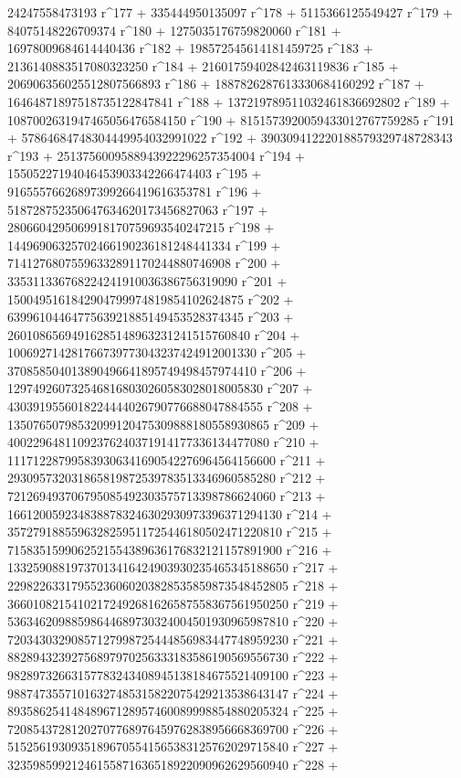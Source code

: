        24247558473193 r^177 + 335444950135097 r^178 + 
       5115366125549427 r^179 + 84075148226709374 r^180 + 
       1275035176759820060 r^181 + 16978009684614440436 r^182 + 
       198572545614181459725 r^183 + 2136140883517080323250 r^184 + 
       21601759402842463119836 r^185 + 
       206906356025512807566893 r^186 + 
       1887826287613330684160292 r^187 + 
       16464871897518735122847841 r^188 + 
       137219789511032461836692802 r^189 + 
       1087002631947465056476584150 r^190 + 
       8151573920059433012767759285 r^191 + 
       57864684748304449954032991022 r^192 + 
       390309412220188579329748728343 r^193 + 
       2513756009588943922296257354004 r^194 + 
       15505227194046453903342266474403 r^195 + 
       91655576626897399266419616353781 r^196 + 
       518728752350647634620173456827063 r^197 + 
       2806604295069918170759693540247215 r^198 + 
       14496906325702466190236181248441334 r^199 + 
       71412768075596332891170244880746908 r^200 + 
       335311336768224241910036386756319090 r^201 + 
       1500495161842904799974819854102624875 r^202 + 
       6399610446477563921885149453528374345 r^203 + 
       26010865694916285148963231241515760840 r^204 + 
       100692714281766739773043237424912001330 r^205 + 
       370858504013890496641895749498457974410 r^206 + 
       1297492607325468168030260583028018005830 r^207 + 
       4303919556018224444026790776688047884555 r^208 + 
       13507650798532099120475309888180558930865 r^209 + 
       40022964811092376240371914177336134477080 r^210 + 
       111712287995839306341690542276964564156600 r^211 + 
       293095732031865819872539783513346960585280 r^212 + 
       721269493706795085492303575713398786624060 r^213 + 
       1661200592348388783246302930973396371294130 r^214 + 
       3572791885596328259511725446180502471220810 r^215 + 
       7158351599062521554389636176832121157891900 r^216 + 
       13325908819737013416424903930235465345188650 r^217 + 
       22982263317955236060203828535859873548452805 r^218 + 
       36601082154102172492681626587558367561950250 r^219 + 
       53634620988598644689730324004501930965987810 r^220 + 
       72034303290857127998725444856983447748959230 r^221 + 
       88289432392756897970256333183586190569556730 r^222 + 
       98289732663157783243408945138184675521409100 r^223 + 
       98874735571016327485315822075429213538643147 r^224 + 
       89358625414848967128957460089998854880205324 r^225 + 
       72085437281202707768976459762838956668369700 r^226 + 
       51525619309351896705541565383125762029715840 r^227 + 
       32359859921246155871636518922090962629560940 r^228 + 
